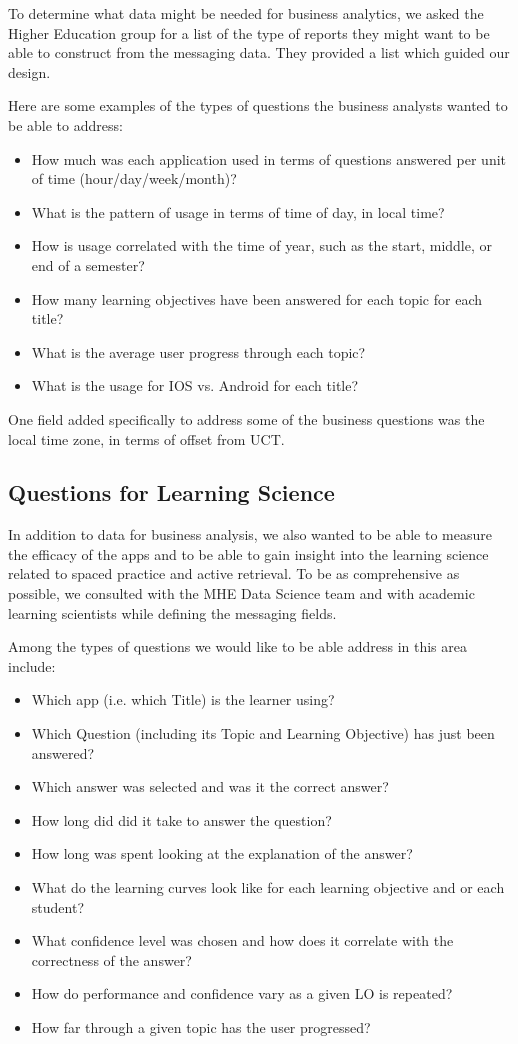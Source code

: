 \documentclass[runningheads,a4paper]{llncs}
\begin{document}
To determine what data might be needed for business analytics, we asked the Higher Education group for a list of the type of reports they might want to be able to construct from the messaging data.  They provided a list which guided our design.

Here are some examples of the types of questions the business analysts wanted to be able to address: 
\begin{itemize}
\item  How much was each application used in terms of questions answered per unit of time (hour/day/week/month)?  
\item What is the pattern of usage in terms of time of day, in local time? 
\item How is usage correlated with the time of year, such as the start, middle, or end of a semester?  
\item How many learning objectives have been answered for each topic for each title?  
\item What is the average user progress through each topic?  
\item What is the usage for IOS vs. Android for each title? 
\end{itemize}

One field added specifically to address some of the business questions was the local time zone, in terms of offset from UCT.  

\subsection{Questions for Learning Science}

In addition to data for business analysis, we also wanted to be able to measure the efficacy of the apps and to be able to gain insight into the learning science related to spaced practice and active retrieval.  To be as comprehensive as possible, we consulted with the MHE Data Science team and with academic learning scientists while defining the messaging fields.

Among the types of questions we would like to be able address in this area include:
\begin{itemize}
\item  Which app (i.e. which Title) is the learner using?
\item Which Question (including its Topic and Learning Objective) has just been answered?
\item Which answer was selected and was it the correct answer?
\item How long did did it take to answer the question?
\item  How long was spent looking at the explanation of the answer?
\item What do the learning curves look like for each learning objective and or each student?
\item What confidence level was chosen and how does it correlate with the correctness of the answer?
\item How do performance and confidence vary as a given LO is repeated?
\item How far through a given topic has the user progressed?
\end{itemize}
\end{document}
